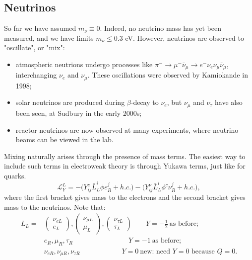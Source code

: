 \subsection{Neutrinos}
%
So far we have assumed $m_\nu \equiv 0$. Indeed, no neutrino mass has yet been measured, and we have limits $m_\nu \leq 0.3$ eV. However, neutrinos are observed to "oscillate", or "mix":
\begin{itemize}
\item atmospheric neutrions undergo processes like $\pi^- \to \mu^- \bar{\nu}_\mu \to e^- \nu_e \nu_\mu \bar{\nu}_\mu$, interchanging $\nu_e$ and $\nu_\mu$. These oscillations were observed by Kamiokande in 1998;
\item solar neutrinos are produced during $\beta$-decay to $\nu_e$, but $\nu_\mu$ and $\nu_\tau$ have also been seen, at Sudbury in the early 2000s;
\item reactor neutrinos are now observed at many experiments, where neutrino beams can be viewed in the lab.
\end{itemize}
Mixing naturally arises through the presence of mass terms. The easiest way to include such terms in electroweak theory is through Yukawa terms, just like for quarks.
\begin{equation}
\mathcal{L}^L_{Y} = - \bigg(Y_{ij}^e \bar{L}_L^i \phi e_R^j + h.c. \bigg) - \bigg(Y_{ij}^\nu \bar{L}_L^i \phi^c \nu_R^j + h.c. \bigg),
\end{equation}
where the first bracket gives mass to the electrons and the second bracket gives mass to the neutrinos. Note that:
\begin{equation}
\begin{split}
L_L = &\begin{pmatrix} \nu_{eL} \\ e_L \end{pmatrix}, 
\begin{pmatrix} \nu_{\mu L} \\ \mu_L \end{pmatrix},
\begin{pmatrix} \nu_{\tau L} \\ \tau_L \end{pmatrix}
\qquad Y=-\frac{1}{2} \ \text{as before}; \\
&e_R, \mu_R, \tau_R \qquad \qquad \qquad \qquad Y=-1 \ \text{as before}; \\
&\nu_{eR}, \nu_{\mu R}, \nu_{\tau R}\qquad \qquad \qquad Y=0\ \text{new: need } Y=0 \text{ because } Q=0.
\end{split}
\end{equation}
